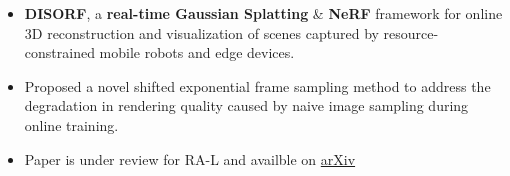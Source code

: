 \documentclass[10pt,a4paper,ragged2e,withhyper]{altacv}
\begin{document}
\begin{paracol}{2}
\begin{itemize}

    \end{itemize}

    \switchcolumn{}

    \begin{itemize}
        \item \textbf{DISORF}, a \textbf{real-time Gaussian Splatting} \& \textbf{NeRF} framework for online 3D
              reconstruction and visualization of scenes captured by resource-constrained mobile robots and edge devices.
        \item Proposed a novel shifted exponential frame sampling method to address the degradation in rendering quality caused by naive image sampling during online training.
        \item Paper is under review for RA-L and availble on \href{https://arxiv.org/abs/2403.00228}{arXiv}
    \end{itemize}







\end{paracol}
\end{document}
